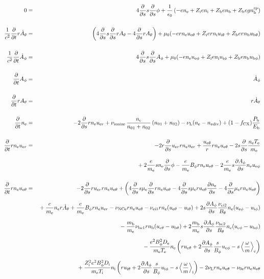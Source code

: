 \documentclass[11pt]{article}
\def\r#1{{\rm#1}}
\def\ddt{\frac{\partial}{\partial t}}
\def\dds{\frac{\partial}{\partial s}}
\def\dd#1{\frac{\partial #1}{\partial s}}
\def\ave#1{\left\langle#1\right\rangle}
\def\me{m_\r{e}}
\def\mb{m_\r{b}}
\def\mue{\mu_\r{e}}
\def\De{D_\r{e}}
\def\Di{D_\r{i}}
\def\ne{n_\r{e}}
\def\ni{n_\r{i}}
\def\nb{n_\r{b}}
\def\uer{u_{\r{e}r}}
\def\ueth{u_{\r{e}\theta}}
\def\uith{u_{\r{i}\theta}}
\def\ubth{u_{\r{b}\theta}}
\def\ueph{u_{\r{e}\phi}}
\def\uiph{u_{\r{i}\phi}}
\def\ubph{u_{\r{b}\phi}}
\def\Bth{B_\theta}
\def\Bph{B_\phi}
\def\Athd{\dot{A}_\theta}
\def\Aphd{\dot{A}_\phi}
\def\Ath{A_\theta}
\def\Aph{A_\phi}
\def\Te{T_\r{e}}
\def\Ti{T_\r{i}}
\def\nna{n_{01}}
\def\nnb{n_{02}}
\def\Zi{Z_\r{i}}
\def\Zb{Z_\r{b}}
\def\Pb{P_\r{b}}
\def\Eb{E_\r{b}}
\def\nbrp{n_\r{b}^\r{rp}}
\def\fCX{f_\r{CX}}
\def\nuNCe{\nu_\r{NCe}}
\def\nune{\nu_\r{0e}}
\def\nuL{\nu_\r{L}}
\def\nuion{\nu_\r{ionize}}
\def\nediv{n_\r{ediv}}
\begin{document}
\begin{eqnarray}
%
% 
  0 &=&
%
    4 \dds s \dds \phi
%
  + \frac{1}{\epsilon_0}
%
    \left(-e \ne + \Zi e \ni + \Zb e \nb + \Zb e g \nbrp \right)
\\[5mm]
%
%
  \frac{1}{c^2} \ddt r \Athd &=&
%
    \left(   4 \dds s \dds r \Ath
%
           - 4 \dds r \Ath \right)
%
  + \mu_0 (-e r \ne \ueth + \Zi e r \ni \uith + \Zb e r \nb \ubth)
\\[5mm]
%
%
  \frac{1}{c^2} \ddt \Aphd &=&
%
    4 \dds s \dds \Aph
%
  + \mu_0 (-e \ne \ueph + \Zi e \ni \uiph + \Zb e \nb \ubph)
%
\\[5mm]
%
%
  \ddt \Aph &=&
%
  \Aphd
\\[5mm]
%
%
  \ddt r \Ath &=&
%
  r \Athd
\\[5mm]
%
%
  \ddt \ne &=&
%
  - 2 \dds r \ne \uer 
%
  + \nuion\, \frac{\ne}{\nna+\nnb}\, (\nna+\nnb)
%
  - \nuL (\ne - \nediv)
%
  + (1 - \fCX) \frac{\Pb}{\Eb}
\\[5mm]
%
%
  \ddt r \ne \uer &=&
%
  - 2 r \dds \uer r \ne \uer
%
  + \frac{\ueth}{r} r \ne \ueth
%
  - 2 s \dds \frac{\ne \Te}{\me}
\nonumber\\[3mm]&&{}
%
  + 2 \frac{e}{\me} s \ne \dds \phi
%
  - \frac{e}{\me} \Bph r \ne \ueth
%
  - 2 \frac{e}{\me} s \dd{\Aph} \ne \ueph
\\[5mm]
%
%
  \ddt r \ne \ueth &=&
%
  - 2 \dds r \uer r \ne \ueth
%
  + \left(    4 \dds s \mue \dds r \ne \ueth
%
            - 4 \dds s \mue r \ueth \dd{\ne}
%
            - 4 \dds \mue r \ne \ueth \right)
\nonumber\\[2.5mm]&&{}
%
  + \frac{e}{\me} \ne r \Athd
%
  + \frac{e}{\me} \Bph r \ne \uer
%
  - \nuNCe r \ne \ueth
%
  - \nu_\r{ei1} r \ne (\ueth - \uith)
%
  + 2 s \dd{\Aph} \frac{\nu_\r{ei2}}{\Bth} \ne (\ueph - \uiph)
\nonumber\\[2.5mm]&&{}
%
  - \frac{\mb}{\me} \nu_\r{be1} r \nb (\ueth - \ubth)
%
  + 2 \frac{\mb}{\me} s \dd{\Aph} \frac{\nu_\r{be2}}{\Bth} \ne (\ueph - \ubph)
\nonumber\\[2.5mm]&&{}
%
  - \frac{e^2 \Bph^2 \De}{\me\Te}\ne
    \left(r \ueth + 2\dd{\Aph}\frac{s}{\Bph}\ueph - s
     \ave{\frac{\omega}{m}}_\r{e} \right)
\nonumber\\[2.5mm]&&{}
%
   + \frac{\Zi^2 e^2 \Bph^2 \Di}{\me\Ti}\ni
    \left(r \uith + 2\dd{\Aph}\frac{s}{\Bph}\uiph - s
     \ave{\frac{\omega}{m}}_\r{i} \right)
%
  - 2 \nuL r \ne \ueth
%
  - \nune r \ne \ueth

\end{eqnarray}
\end{document}
